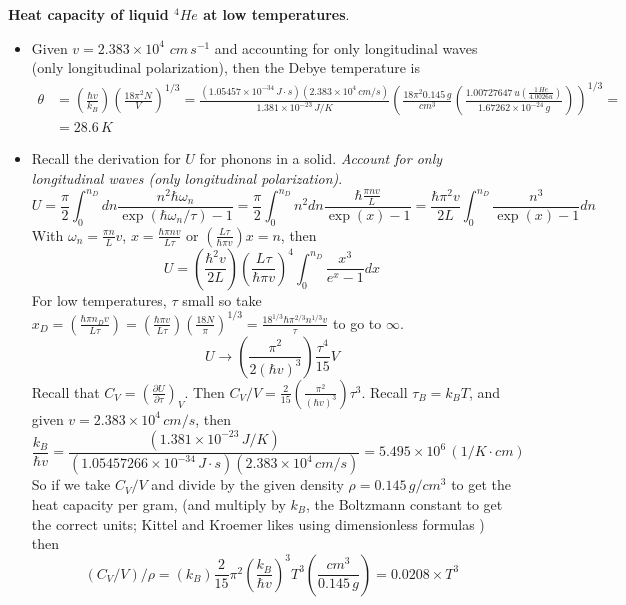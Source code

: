   \textbf{Heat capacity of liquid $^4He$ at low temperatures}.  \begin{itemize}
\item[(a)] Given $v = 2.383 \times 10^4$ $cm \, s^{-1}$ and accounting for only longitudinal waves (only longitudinal polarization), then the Debye temperature is 
\[
\begin{aligned}
\theta & = \left( \frac{ \hbar v }{k_B } \right) \left( \frac{ 18 \pi^2 N }{V} \right)^{1/3} = \frac{ (1.05457 \times 10^{-34} \, J\cdot s )(2.383 \times 10^4 \, cm/s) }{ 1.381 \times 10^{-23} \, J/K} \left( \frac{ 18 \pi^2 0.145 \, g }{cm^3 } \left( \frac{ 1.00727647 \, u \left( \frac{ 1 \, He }{ 4.0026 u } \right) }{ 1.67262 \times 10^{-24 } \, g } \right) \right)^{1/3} = \\
& = \boxed{ 28.6 \, K }
\end{aligned}
\]
\item[(b)] Recall the derivation for $U$ for phonons in a solid.  \emph{Account for only longitudinal waves (only longitudinal polarization)}.  
\[
U = \frac{\pi}{2} \int_0^{n_D} dn \frac{ n^2 \hbar \omega_n }{ \exp{ (\hbar \omega_n /\tau) } - 1 } = \frac{\pi}{2} \int_0^{n_D} n^2 dn \frac{ \hbar \frac{ \pi n v }{L} }{ \exp{ (x)} - 1 } = \frac{ \hbar \pi^2 v}{2L} \int_0^{n_D} \frac{ n^3 }{\exp{ (x) } - 1 } dn
\]
With $\omega_n = \frac{\pi n }{L} v$, $x = \frac{ \hbar \pi n v}{L \tau} $ or $\left( \frac{ L \tau}{\hbar \pi v} \right) x = n$, then 
\[
U  = \left( \frac{ \hbar^2 v}{ 2L } \right) \left( \frac{ L \tau }{ \hbar \pi v} \right)^4 \int_0^{n_D} \frac{x^3}{e^x - 1 } dx 
\]
For low temperatures, $\tau$ small so take $x_D = \left( \frac{ \hbar \pi n_D v}{ L \tau} \right) = \left( \frac{\hbar \pi v}{ L \tau} \right) \left( \frac{18 N}{\pi} \right)^{1/3} = \frac{ 18^{1/3} \hbar \pi^{2/3} n^{1/3} v }{ \tau}$ to go to $\infty$.  
\[
U \to \left( \frac{ \pi^2 }{ 2 (\hbar v )^3} \right) \frac{ \tau^4 }{15} V
\]
Recall that $C_V = \left( \frac{ \partial U}{\partial \tau} \right)_{V}$.  Then $C_V/V = \frac{2}{15} \left( \frac{ \pi^2 }{ (\hbar v)^3 } \right) \tau^3 $.  Recall $\tau_B = k_B T$, and given $v= 2.383 \times 10^4 \, cm/s$, then
\[
\frac{ k_B }{ \hbar v} = \frac{ (1.381 \times 10^{-23} \, J/K )}{ (1.05457266 \times 10^{-34} \, J\cdot s )( 2.383 \times 10^{4} \, cm/s ) } = 5.495 \times 10^6 \, (1/K\cdot cm )
\]
So if we take $C_V/V$ and divide by the given density $\rho = 0.145 \, g/cm^3$ to get the heat capacity per gram, (and multiply by $k_B$, the Boltzmann constant to get the correct units; Kittel and Kroemer likes using dimensionless formulas ) then
\[
(C_V/V)/\rho = (k_B) \frac{2}{15} \pi^2 \left( \frac{k_B}{ \hbar v} \right)^3 T^3 \left( \frac{cm^3}{0.145 \, g } \right) = \boxed{ 0.0208 \times T^3 }
\]
\end{itemize}

